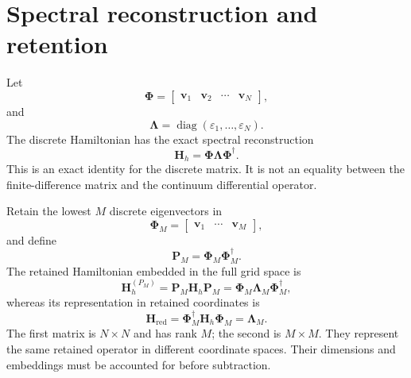 \section{Spectral reconstruction and retention}

Let
\begin{equation}
    \boldsymbol\Phi
    =
    \begin{bmatrix}
        \mathbf v_1 & \mathbf v_2 & \cdots & \mathbf v_N
    \end{bmatrix},
\end{equation}
and
\begin{equation}
    \boldsymbol\Lambda
    =
    \operatorname{diag}
    (\varepsilon_1,\ldots,\varepsilon_N).
\end{equation}
The discrete Hamiltonian has the exact spectral reconstruction
\begin{equation}
    \mathbf H_h
    =
    \boldsymbol\Phi
    \boldsymbol\Lambda
    \boldsymbol\Phi^\dagger.
\end{equation}
This is an exact identity for the discrete matrix. It is not an equality
between the finite-difference matrix and the continuum differential operator.

Retain the lowest $M$ discrete eigenvectors in
\begin{equation}
    \boldsymbol\Phi_M
    =
    \begin{bmatrix}
        \mathbf v_1 & \cdots & \mathbf v_M
    \end{bmatrix},
\end{equation}
and define
\begin{equation}
    \mathbf P_M
    =
    \boldsymbol\Phi_M
    \boldsymbol\Phi_M^\dagger.
\end{equation}
The retained Hamiltonian embedded in the full grid space is
\begin{equation}
    \mathbf H_h^{(P_M)}
    =
    \mathbf P_M\mathbf H_h\mathbf P_M
    =
    \boldsymbol\Phi_M
    \boldsymbol\Lambda_M
    \boldsymbol\Phi_M^\dagger,
\end{equation}
whereas its representation in retained coordinates is
\begin{equation}
    \mathbf H_{\mathrm{red}}
    =
    \boldsymbol\Phi_M^\dagger
    \mathbf H_h
    \boldsymbol\Phi_M
    =
    \boldsymbol\Lambda_M.
\end{equation}
The first matrix is $N\times N$ and has rank $M$; the second is $M\times M$.
They represent the same retained operator in different coordinate spaces.
Their dimensions and embeddings must be accounted for before subtraction.

